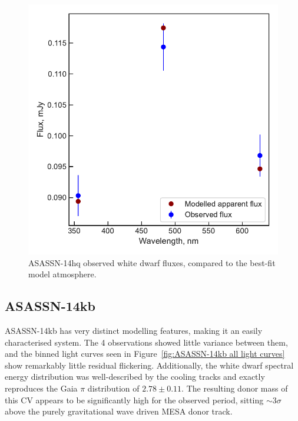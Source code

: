 \begin{figure}
    \centering
    \includegraphics[width=\textwidth]{figures/results/ASASSN-14hq/fluxplot.pdf}
    \caption{ASASSN-14hq observed white dwarf fluxes, compared to the best-fit model atmosphere.}
    \label{fig:ASASSN-14hq flux plot}
\end{figure}
\clearpage



\newpage
\subsection{ASASSN-14kb}

ASASSN-14kb has very distinct modelling features, making it an easily characterised system. The 4 observations showed little variance between them, and the binned light curves seen in Figure~\ref{fig:ASASSN-14kb all light curves} show remarkably little residual flickering. Additionally, the white dwarf spectral energy distribution was well-described by the cooling tracks and exactly reproduces the Gaia $\pi$ distribution of $2.78\pm0.11$.
The resulting donor mass of this CV appears to be significantly high for the observed period, sitting $\sim 3\sigma$ above the purely gravitational wave driven MESA donor track.

%     

